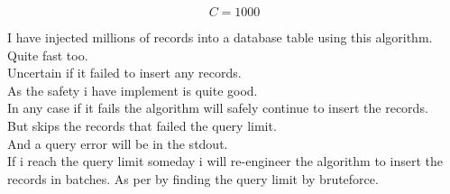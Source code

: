 \begin{equation}
    C = 1000
\end{equation}

I have injected millions of records into a database table using this algorithm. \\
Quite fast too. \\
Uncertain if it failed to insert any records. \\
As the safety i have implement is quite good. \\
In any case if it fails the algorithm will safely continue to insert the records. \\
But skips the records that failed the query limit. \\ 
And a query error will be in the stdout. \\

If i reach the query limit someday i will re-engineer the algorithm to insert the records in batches. As per by finding the query limit by bruteforce.










 








 

